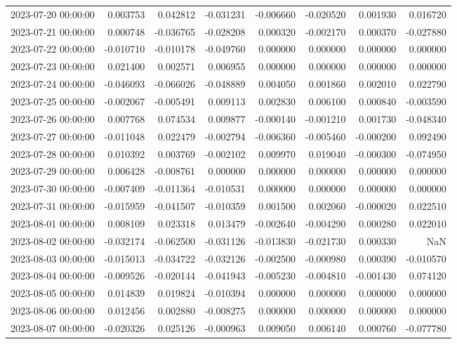 \begin{tabular}{lrrrrrrr}
2023-07-20 00:00:00 & 0.003753 & 0.042812 & -0.031231 & -0.006660 & -0.020520 & 0.001930 & 0.016720 \\
2023-07-21 00:00:00 & 0.000748 & -0.036765 & -0.028208 & 0.000320 & -0.002170 & 0.000370 & -0.027880 \\
2023-07-22 00:00:00 & -0.010710 & -0.010178 & -0.049760 & 0.000000 & 0.000000 & 0.000000 & 0.000000 \\
2023-07-23 00:00:00 & 0.021400 & 0.002571 & 0.006955 & 0.000000 & 0.000000 & 0.000000 & 0.000000 \\
2023-07-24 00:00:00 & -0.046093 & -0.066026 & -0.048889 & 0.004050 & 0.001860 & 0.002010 & 0.022790 \\
2023-07-25 00:00:00 & -0.002067 & -0.005491 & 0.009113 & 0.002830 & 0.006100 & 0.000840 & -0.003590 \\
2023-07-26 00:00:00 & 0.007768 & 0.074534 & 0.009877 & -0.000140 & -0.001210 & 0.001730 & -0.048340 \\
2023-07-27 00:00:00 & -0.011048 & 0.022479 & -0.002794 & -0.006360 & -0.005460 & -0.000200 & 0.092490 \\
2023-07-28 00:00:00 & 0.010392 & 0.003769 & -0.002102 & 0.009970 & 0.019040 & -0.000300 & -0.074950 \\
2023-07-29 00:00:00 & 0.006428 & -0.008761 & 0.000000 & 0.000000 & 0.000000 & 0.000000 & 0.000000 \\
2023-07-30 00:00:00 & -0.007409 & -0.011364 & -0.010531 & 0.000000 & 0.000000 & 0.000000 & 0.000000 \\
2023-07-31 00:00:00 & -0.015959 & -0.041507 & -0.010359 & 0.001500 & 0.002060 & -0.000020 & 0.022510 \\
2023-08-01 00:00:00 & 0.008109 & 0.023318 & 0.013479 & -0.002640 & -0.004290 & 0.000280 & 0.022010 \\
2023-08-02 00:00:00 & -0.032174 & -0.062500 & -0.031126 & -0.013830 & -0.021730 & 0.000330 & NaN \\
2023-08-03 00:00:00 & -0.015013 & -0.034722 & -0.032126 & -0.002500 & -0.000980 & 0.000390 & -0.010570 \\
2023-08-04 00:00:00 & -0.009526 & -0.020144 & -0.041943 & -0.005230 & -0.004810 & -0.001430 & 0.074120 \\
2023-08-05 00:00:00 & 0.014839 & 0.019824 & -0.010394 & 0.000000 & 0.000000 & 0.000000 & 0.000000 \\
2023-08-06 00:00:00 & 0.012456 & 0.002880 & -0.008275 & 0.000000 & 0.000000 & 0.000000 & 0.000000 \\
2023-08-07 00:00:00 & -0.020326 & 0.025126 & -0.000963 & 0.009050 & 0.006140 & 0.000760 & -0.077780 \\

\end{tabular}
